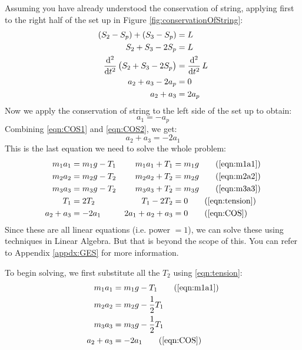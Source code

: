\documentclass[11pt]{article}
\begin{document}
	Assuming you have already understood the conservation of string, applying first to the right half of the set up in Figure \ref{fig:conservationOfString}:
	\begin{align}
		(S_2 - S_p) + (S_3 - S_p) &= L \notag \\
		S_2 + S_3 - 2S_p &= L \notag \\
		\dod[2]{}{t}\left(S_2 + S_3 - 2S_p\right) &= \dod[2]{}{t}L \notag\\
		a_2 + a_3 - 2a_p &= 0 \notag \\
		a_2 + a_3 &= 2a_p \label{eqn:COS1}
	\end{align}
	Now we apply the conservation of string to the left side of the set up to obtain:
	\begin{equation}
		a_1 = -a_p \label{eqn:COS2}
	\end{equation}
	Combining \eqref{eqn:COS1} and \eqref{eqn:COS2}, we get:
	\begin{equation}
		a_2 + a_3 = -2a_1 \label{eqn:COS}
	\end{equation}
	This is the last equation we need to solve the whole problem:
	\begin{align*}
		m_1 a_1 &= m_1 g - T_1  &m_1 a_1 + T_1 &= m_1 g \tag{\ref{eqn:m1a1}} \\
		m_2 a_2 &= m_2 g - T_2  &m_2 a_2 + T_2 &= m_2 g \tag{\ref{eqn:m2a2}} \\
		m_3 a_3 &= m_3 g - T_2  &m_3 a_3 + T_2 &= m_3 g \tag{\ref{eqn:m3a3}} \\
		T_1 &= 2 T_2 			&T_1 - 2 T_2 &= 0 \tag{\ref{eqn:tension}} \\
		a_2 + a_3 &= -2a_1 		&2a_1 + a_2 + a_3 &= 0 \tag{\ref{eqn:COS}}
	\end{align*}
	Since these are all linear equations (i.e. power $= 1$), we can solve these using techniques in Linear Algebra. But that is beyond the scope of this. You can refer to Appendix \ref{appdx:GES} for more information.
	
	To begin solving, we first substitute all the $T_2$ using \eqref{eqn:tension}: 
	\begin{align}
	m_1 a_1 &= m_1 g - T_1  \notag \tag{\ref{eqn:m1a1}} \\
	m_2 a_2 &= m_2 g - \frac{1}{2} T_1  \label{eqn:m2a2-2} \\
	m_3 a_3 &= m_3 g - \frac{1}{2} T_1  \label{eqn:m3a3-2} \\
	a_2 + a_3 &= -2a_1 	\notag \tag{\ref{eqn:COS}}
	\end{align}
	
\end{document}
